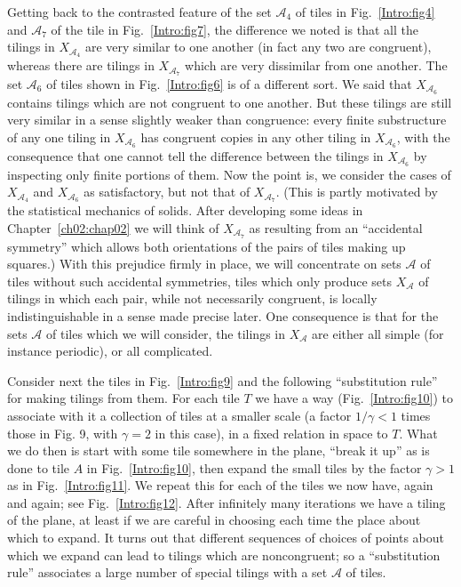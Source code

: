 \documentclass[reqno]{stml-l}
\theoremstyle{plain}
\theoremstyle{definition}
\numberwithin{equation}{chapter}
\begin{document}
Getting back to the contrasted feature of the set $\mathcal{A}_{4}$ of tiles in Fig.~\ref{Intro:fig4} and $\mathcal{A}_{7}$ of the tile in Fig.~\ref{Intro:fig7}, the difference we noted is that all the tilings in $X_{\mathcal{A}_{4}}$ are very similar to one another (in fact any two are congruent), whereas there are tilings in $X_{\mathcal{A}_{7}}$ which are very dissimilar from one another. The set $\mathcal{A}_{6}$ of tiles shown in Fig.~\ref{Intro:fig6} is of a different sort. We said that $X_{\mathcal{A}_{6}}$ contains tilings which are not congruent to one another. But these tilings are still very similar in a sense slightly weaker than congruence: every finite substructure of any one tiling in $X_{\mathcal{A}_{6}}$ has congruent copies in any other tiling in $X_{\mathcal{A}_{6}}$, with the consequence that one cannot tell the difference between the tilings in $X_{\mathcal{A}_{6}}$ by inspecting only finite portions of them. Now the point is, we consider the cases of $X_{\mathcal{A}_{4}}$ and $X_{\mathcal{A}_{6}}$ as satisfactory, but not that of $X_{\mathcal{A}_{7}}$. (This is partly motivated by the statistical mechanics of solids. After developing some ideas in Chapter~\ref{ch02:chap02} we will think of $X_{\mathcal{A}_{7}}$ as resulting from an ``accidental symmetry'' which allows both orientations of the pairs of tiles making up squares.) With this prejudice firmly in place, we will concentrate on sets $\mathcal{A}$ of tiles without such accidental symmetries, tiles which only produce sets $X_{\mathcal{A}}$ of tilings in which each pair, while not necessarily congruent, is locally indistinguishable in a sense made precise later. One consequence is that for the sets $\mathcal{A}$ of tiles which we will consider, the tilings in $X_{\mathcal{A}}$ are either all simple (for instance periodic), or all complicated.

Consider next the tiles in Fig.~\ref{Intro:fig9} and the following ``substitution rule'' for making tilings from them. For each tile $T$ we have a way (Fig.~\ref{Intro:fig10}) to associate with it a collection of tiles at a smaller scale (a factor $1/\gamma<1$ times those in Fig. 9, with $\gamma=2$ in this case), in a fixed relation in space to $T$. What we do then is start with some tile somewhere in the plane, ``break it up'' as is done to tile $A$ in Fig.~\ref{Intro:fig10}, then expand the small tiles by the factor $\gamma>1$ as in Fig.~\ref{Intro:fig11}. We repeat this for each of the tiles we now have, again and again; see Fig.~\ref{Intro:fig12}. After infinitely many iterations we have a tiling of the plane, at least if we are careful in choosing each time the place about which to expand. It turns out that different sequences of choices of points about which we expand can lead to tilings which are noncongruent; so a ``substitution rule'' associates a large number of special tilings with a set $\mathcal{A}$ of tiles.
\end{document}
